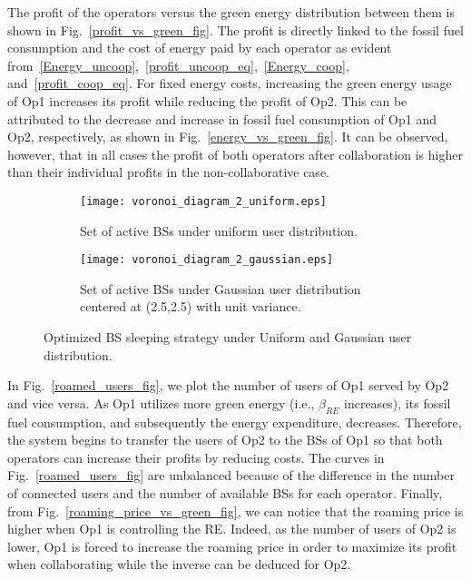 \documentclass[10pt, letter, twocolumn]{IEEEtran}
\begin{document}
The profit of the operators versus the green energy distribution between them is shown in Fig.~\ref{profit_vs_green_fig}. The profit is directly linked to the fossil fuel consumption and the cost of energy paid by each operator as evident from~\eqref{Energy_uncoop},~\eqref{profit_uncoop_eq},~\eqref{Energy_coop}, and~\eqref{profit_coop_eq}. For fixed energy costs, increasing the green energy usage of Op1 increases its profit while reducing the profit of Op2. This can be attributed to the decrease and increase in fossil fuel consumption of Op1 and Op2, respectively, as shown in Fig.~\ref{energy_vs_green_fig}. It can be observed, however, that in all cases the profit of both operators after collaboration is higher than their individual profits in the non-collaborative case.

\begin{figure}[t]
\begin{subfigure}[t]{.45\textwidth}
  \centering
    \texttt{[image: voronoi\_diagram\_2\_uniform.eps]}
    \caption{Set of active BSs under uniform user distribution.}
    \label{uniform_user_voronoi}
  \end{subfigure}\hfill
  \begin{subfigure}[t]{.45\textwidth}
  \centering
    \texttt{[image: voronoi\_diagram\_2\_gaussian.eps]}
    \caption{Set of active BSs under Gaussian user distribution centered at (2.5,2.5) with unit variance.}
    \label{gaussian_user_voronoi}
  \end{subfigure}
\caption{Optimized BS sleeping strategy under Uniform and Gaussian user distribution.}
\label{voronoi_fig2}
\end{figure}

In Fig.~\ref{roamed_users_fig}, we plot the number of users of Op1 served by Op2 and vice versa. As Op1 utilizes more green energy (i.e., $\beta_{RE}$ increases), its fossil fuel consumption, and subsequently the energy expenditure, decreases. Therefore, the system begins to transfer the users of Op2 to the BSs of Op1 so that both operators can increase their profits by reducing costs. The curves in Fig.~\ref{roamed_users_fig} are unbalanced because of the difference in the number of connected users and the number of available BSs for each operator. Finally, from Fig.~\ref{roaming_price_vs_green_fig}, we can notice that the roaming price is higher when Op1 is controlling the RE. Indeed, as the number of users of Op2 is lower, Op1 is forced to increase the roaming price in order to maximize its profit when collaborating while the inverse can be deduced for Op2.
\end{document}
